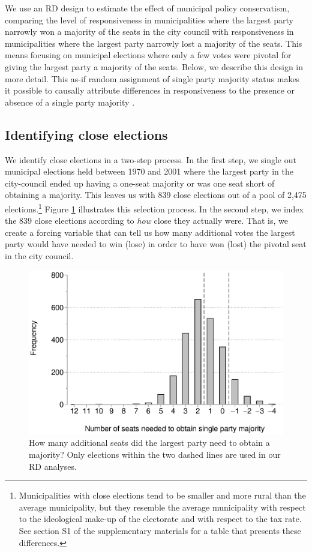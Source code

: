 \documentclass[a4paper,12pt]{article}
\begin{document}
We use an RD design to estimate the effect of municipal policy conservatism, comparing the level of responsiveness in municipalities where the largest party narrowly won a majority of the seats in the city council with responsiveness in municipalities where the largest party narrowly lost a majority of the seats. This means focusing on municipal elections where only a few votes were pivotal for giving the largest party a majority of the seats. Below, we describe this design in more detail. This as-if random assignment of single party majority status makes it possible to causally attribute differences in responsiveness to the presence or absence of a single party majority \citep{lee2008randomized,skovron2015practical}.  

\subsection{Identifying close elections}
We identify close elections in a two-step process. In the first step, we single out municipal elections held between 1970 and 2001 where the largest party in the city-council ended up having a one-seat majority or was one seat short of obtaining a majority. This leaves us with 839 close elections out of a pool of 2,475 elections.\footnote{Municipalities with close elections tend to be smaller and more rural than the average municipality, but they resemble the average municipality with respect to the ideological make-up of the electorate and with respect to the tax rate. See section S1 of the supplementary materials for a table that presents these differences.} Figure \ref{figure:closeelec} illustrates this selection process. In the second step, we index the 839 close elections according to \emph{how} close they actually were. That is, we create a forcing variable that can tell us how many additional votes the largest party would have needed to win (lose) in order to have won (lost) the pivotal seat in the city council.


\begin{figure}[htbp] 
	\centering
	\includegraphics[width=1\textwidth]{closeelec.eps}
	\caption{How many additional seats did the largest party need to obtain a majority? Only elections within the two dashed lines are used in our RD analyses.}
	\label{figure:closeelec}
\end{figure}
\end{document}
